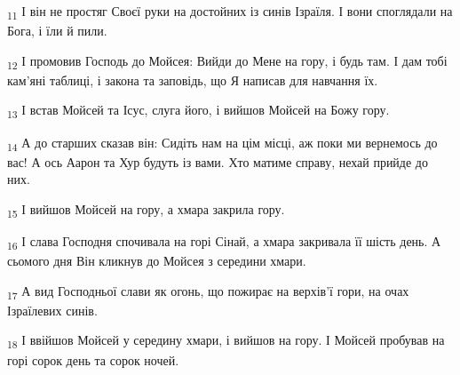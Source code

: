 \begin{tcolorbox}
\textsubscript{11} І він не простяг Своєї руки на достойних із синів Ізраїля. І вони споглядали на Бога, і їли й пили.
\end{tcolorbox}
\begin{tcolorbox}
\textsubscript{12} І промовив Господь до Мойсея: Вийди до Мене на гору, і будь там. І дам тобі кам'яні таблиці, і закона та заповідь, що Я написав для навчання їх.
\end{tcolorbox}
\begin{tcolorbox}
\textsubscript{13} І встав Мойсей та Ісус, слуга його, і вийшов Мойсей на Божу гору.
\end{tcolorbox}
\begin{tcolorbox}
\textsubscript{14} А до старших сказав він: Сидіть нам на цім місці, аж поки ми вернемось до вас! А ось Аарон та Хур будуть із вами. Хто матиме справу, нехай прийде до них.
\end{tcolorbox}
\begin{tcolorbox}
\textsubscript{15} І вийшов Мойсей на гору, а хмара закрила гору.
\end{tcolorbox}
\begin{tcolorbox}
\textsubscript{16} І слава Господня спочивала на горі Сінай, а хмара закривала її шість день. А сьомого дня Він кликнув до Мойсея з середини хмари.
\end{tcolorbox}
\begin{tcolorbox}
\textsubscript{17} А вид Господньої слави як огонь, що пожирає на верхів'ї гори, на очах Ізраїлевих синів.
\end{tcolorbox}
\begin{tcolorbox}
\textsubscript{18} І ввійшов Мойсей у середину хмари, і вийшов на гору. І Мойсей пробував на горі сорок день та сорок ночей.
\end{tcolorbox}
